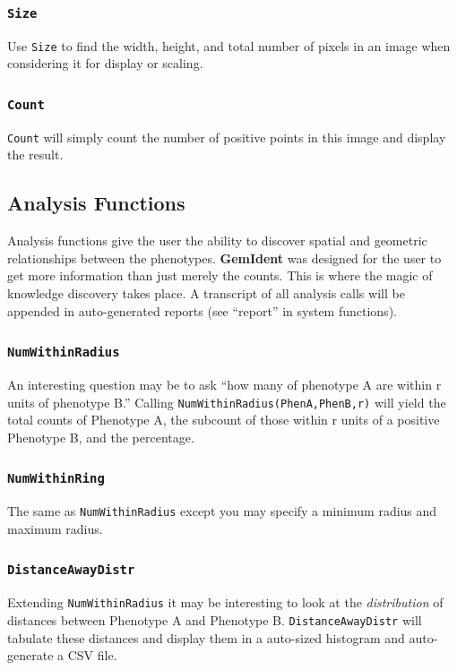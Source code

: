 \documentclass[12pt]{article}
\begin{document}
\subsubsection{\tt Size}

Use {\tt Size} to find the width, height, and total number of pixels in an image when considering it for display or scaling.

\subsubsection{\tt Count}

{\tt Count} will simply count the number of positive points in this image and display the result.

\subsection{Analysis Functions}

Analysis functions give the user the ability to discover spatial and geometric relationships between the phenotypes. {\bf GemIdent} was designed for the user to get more information than just merely the counts. This is where the magic of knowledge discovery takes place. A transcript of all analysis calls will be appended in auto-generated reports (see ``report'' in system functions).

\subsubsection{\tt NumWithinRadius}

An interesting question may be to ask ``how many of phenotype A are within r units of phenotype B.'' Calling {\tt NumWithinRadius(PhenA,PhenB,r)} will yield the total counts of Phenotype A, the subcount of those within r units of a positive Phenotype B, and the percentage.

\subsubsection{\tt NumWithinRing}

The same as {\tt NumWithinRadius} except you may specify a minimum radius and maximum radius.

\subsubsection{\tt DistanceAwayDistr}

Extending {\tt NumWithinRadius} it may be interesting to look at the {\emph{distribution}} of distances between Phenotype A and Phenotype B. {\tt DistanceAwayDistr} will tabulate these distances and display them in a auto-sized histogram and auto-generate a CSV file.
\end{document}
